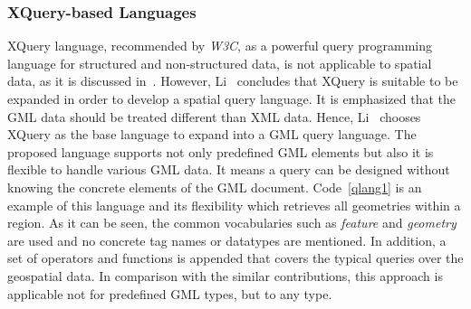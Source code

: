 \documentclass[a4paper,12pt]{article}
\begin{document}
\subsubsection{XQuery-based Languages}
\label{xquery-based}
XQuery language, recommended by \emph{W3C}, as a powerful query programming language for structured and non-structured data, 
is not applicable to spatial data, as it is discussed in~\cite{Lisa2006,Chen2010}. 
However, Li~\cite{Lisa2006} concludes that XQuery is suitable to be expanded in order to develop a spatial query language.
It is emphasized that the GML data should be treated different than XML data. Hence, Li~\cite{Lisa2006} chooses XQuery as the base language to expand into a GML query language. The proposed language supports not only predefined GML elements but also it is flexible to handle various GML data. 
It means a query can be designed without knowing the concrete elements of the GML document.
Code~\ref{qlang1} is an example of this language and its flexibility
which retrieves all geometries within a region. As it can be seen, 
the common vocabularies such as \textit{feature} and \textit{geometry} are used and no concrete tag names or datatypes are mentioned.
In addition, a set of operators and functions is appended that covers the typical queries over the geospatial data. 
In comparison with the similar contributions, this approach is applicable not for predefined GML types, but to any type.

\vspace{10px}
\vspace{10px}
\end{document}
